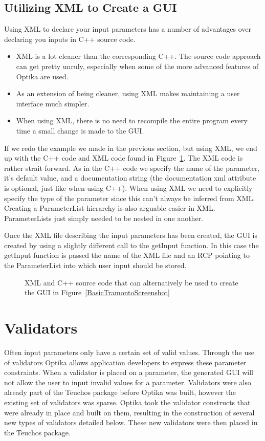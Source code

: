 \subsection{Utilizing XML to Create a GUI}
Using XML to declare your input parameters has a number of advantages over declaring you inputs in C++ source code.
\begin{itemize}
  \item XML is a lot cleaner than the corresponding C++. The source code approach can get pretty unruly, especially
  when some of the more advanced features of Optika are used.
  \item As an extension of being cleaner, using XML makes maintaining a user interface much simpler.
  \item When using XML, there is no need to recompile the entire program every time a small change is made to the GUI.
\end{itemize}
If we redo the example we made in the previous section, but using XML, we end up with the C++ code and XML code found in
Figure~\ref{basicTramontoXML}. The XML code is rather strait forward. As in the C++ code we specify the name of the
parameter, it's default value, and a documentation string (the documentation xml attribute is optional, just like when using 
C++). When using XML we need to explicitly specify the type
of the parameter since this can't always be inferred from XML. Creating a ParameterList hierarchy is also arguable easier
in XML. ParameterLists just simply needed to be nested in one another.

Once the XML file describing the input parameters has been created, the GUI is created by using a slightly different
call to the getInput function. In this case the getInput function is passed the name of the XML file and an RCP pointing
to the ParameterList into which user input should be stored.
	\begin{figure}
		\subfigure[C++ Code]{
    
		\label{basicXMLC++}
		}
		\caption{XML and C++ source code that can alternatively be used to create the GUI in Figure~\ref{BasicTramontoScreenshot}}
		\label{basicTramontoXML}
	\end{figure}

\section{Validators}
Often input parameters only have a certain set of valid values. Through the use of validators Optika allows application
developers to express these parameter constraints. When a validator is placed on a parameter, the generated GUI will
not allow the user to input invalid values for a parameter. Validators were also already part of the Teuchos package
before Optika was built, however the existing set of validators was sparse. Optika took the validator constructs that
were already in place and built on them, resulting in the construction of several new types of validators detailed below.
These new validators were then placed in the Teuchos package.

